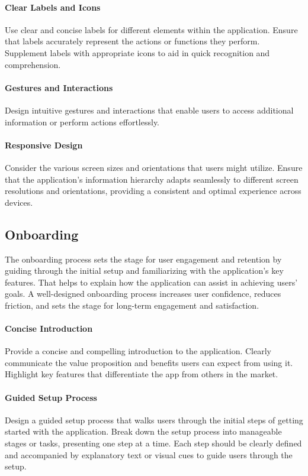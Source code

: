 \paragraph{Clear Labels and Icons}
Use clear and concise labels for different elements within the application. Ensure that labels accurately represent the 
actions or functions they perform. Supplement labels with appropriate icons to aid in quick recognition and comprehension.

\paragraph{Gestures and Interactions}
Design intuitive gestures and interactions that enable users to access additional information or perform actions 
effortlessly.

\paragraph{Responsive Design}
Consider the various screen sizes and orientations that users might utilize. Ensure that the 
application's information hierarchy adapts seamlessly to different screen resolutions and orientations, providing a 
consistent and optimal experience across devices.


\subsection{Onboarding}

The onboarding process sets the stage for user engagement and retention by guiding through the initial setup and 
familiarizing with the application's key features. That helps to explain how the application can assist in achieving 
users' goals. A well-designed onboarding process increases user confidence, reduces friction, and sets the stage for 
long-term engagement and satisfaction.

\paragraph{Concise Introduction}
Provide a concise and compelling introduction to the application. Clearly communicate the value proposition and benefits 
users can expect from using it. Highlight key features that differentiate the app from others in the market.

\paragraph{Guided Setup Process}
Design a guided setup process that walks users through the initial steps of getting started with the application. Break 
down the setup process into manageable stages or tasks, presenting one step at a time. Each step should be clearly 
defined and accompanied by explanatory text or visual cues to guide users through the setup.

